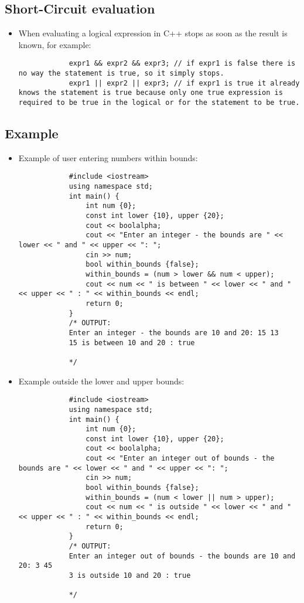 \subsection{Short-Circuit evaluation}
\begin{itemize}
    \item When evaluating a logical expression in C++ stops as soon as the result is known, for example: 
        \begin{verbatim}
            expr1 && expr2 && expr3; // if expr1 is false there is no way the statement is true, so it simply stops.
            expr1 || expr2 || expr3; // if expr1 is true it already knows the statement is true because only one true expression is required to be true in the logical or for the statement to be true.
        \end{verbatim}
\end{itemize}

\subsection{Example}
\begin{itemize}
    \item Example of user entering numbers within bounds:
        \begin{verbatim}
            #include <iostream>
            using namespace std;
            int main() {
                int num {0};
                const int lower {10}, upper {20};
                cout << boolalpha;
                cout << "Enter an integer - the bounds are " << lower << " and " << upper << ": ";
                cin >> num;
                bool within_bounds {false};
                within_bounds = (num > lower && num < upper);
                cout << num << " is between " << lower << " and " << upper << " : " << within_bounds << endl;
                return 0;
            }
            /* OUTPUT:
            Enter an integer - the bounds are 10 and 20: 15 13
            15 is between 10 and 20 : true

            */
        \end{verbatim}
    
    \item Example outside the lower and upper bounds: 
        \begin{verbatim}
            #include <iostream>
            using namespace std;
            int main() {
                int num {0};
                const int lower {10}, upper {20};
                cout << boolalpha;
                cout << "Enter an integer out of bounds - the bounds are " << lower << " and " << upper << ": ";
                cin >> num;
                bool within_bounds {false};
                within_bounds = (num < lower || num > upper);
                cout << num << " is outside " << lower << " and " << upper << " : " << within_bounds << endl;
                return 0;
            }
            /* OUTPUT:
            Enter an integer out of bounds - the bounds are 10 and 20: 3 45
            3 is outside 10 and 20 : true

            */
        \end{verbatim}
\end{itemize}


